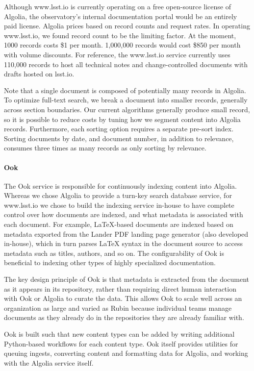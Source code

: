 Although www.lsst.io is currently operating on a free open-source license of Algolia, the observatory's internal documentation portal would be an entirely paid license. Algolia prices based on record counts and request rates. In operating www.lsst.io, we found record count to be the limiting factor. At the moment, 1000 records costs \$1 per month. 1,000,000 records would cost \$850 per month with volume discounts. For reference, the www.lsst.io service currently uses 110,000 records to host all technical notes and change-controlled documents with drafts hosted on lsst.io.

Note that a single document is composed of potentially many records in Algolia. To optimize full-text search, we break a document into smaller records, generally across section boundaries. Our current algorithms generally produce small record, so it is possible to reduce costs by tuning how we segment content into Algolia records. Furthermore, each sorting option requires a separate pre-sort index. Sorting documents by date, and document number, in addition to relevance, consumes three times as many records as only sorting by relevance.

\paragraph{Ook}

The Ook service is responsible for continuously indexing content into Algolia. Whereas we chose Algolia to provide a turn-key search database service, for www.lsst.io we chose to build the indexing service in-house to have complete control over how documents are indexed, and what metadata is associated with each document. For example, LaTeX-based documents are indexed based on metadata exported from the Lander PDF landing page generator (also developed in-house), which in turn parses LaTeX syntax in the document source to access metadata such as titles, authors, and so on. The configurability of Ook is beneficial to indexing other types of highly specialized documentation.

The key design principle of Ook is that metadata is extracted from the document as it appears in its repository, rather than requiring direct human interaction with Ook or Algolia to curate the data. This allows Ook to scale well across an organization as large and varied as Rubin because individual teams manage documents as they already do in the repositories they are already familiar with.

Ook is built such that new content types can be added by writing additional Python-based workflows for each content type. Ook itself provides utilities for queuing ingests, converting content and formatting data for Algolia, and working with the Algolia service itself.

